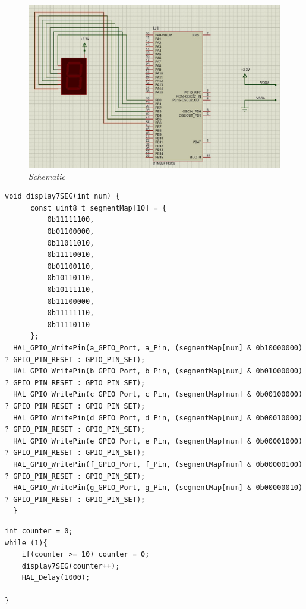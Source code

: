 \begin{figure}[!htp]
    \centering
    \includegraphics[width=5in]{source/picture/bai_1/pic4.jpg}
    \caption{\textit{Schematic}}
    \label{bai1_pic3}
\end{figure}
\begin{lstlisting}[caption=Ex4.c]
void display7SEG(int num) {
      const uint8_t segmentMap[10] = {
          0b11111100,
          0b01100000,
          0b11011010,
          0b11110010,
          0b01100110,
          0b10110110,
          0b10111110,
          0b11100000,
          0b11111110,
          0b11110110
      };
  HAL_GPIO_WritePin(a_GPIO_Port, a_Pin, (segmentMap[num] & 0b10000000) ? GPIO_PIN_RESET : GPIO_PIN_SET);
  HAL_GPIO_WritePin(b_GPIO_Port, b_Pin, (segmentMap[num] & 0b01000000) ? GPIO_PIN_RESET : GPIO_PIN_SET);
  HAL_GPIO_WritePin(c_GPIO_Port, c_Pin, (segmentMap[num] & 0b00100000) ? GPIO_PIN_RESET : GPIO_PIN_SET);
  HAL_GPIO_WritePin(d_GPIO_Port, d_Pin, (segmentMap[num] & 0b00010000) ? GPIO_PIN_RESET : GPIO_PIN_SET);
  HAL_GPIO_WritePin(e_GPIO_Port, e_Pin, (segmentMap[num] & 0b00001000) ? GPIO_PIN_RESET : GPIO_PIN_SET);
  HAL_GPIO_WritePin(f_GPIO_Port, f_Pin, (segmentMap[num] & 0b00000100) ? GPIO_PIN_RESET : GPIO_PIN_SET);
  HAL_GPIO_WritePin(g_GPIO_Port, g_Pin, (segmentMap[num] & 0b00000010) ? GPIO_PIN_RESET : GPIO_PIN_SET);
  }
\end{lstlisting}

\begin{lstlisting}[caption=main.c]
int counter = 0;
while (1){
    if(counter >= 10) counter = 0;    
    display7SEG(counter++);
    HAL_Delay(1000);

}
\end{lstlisting}



